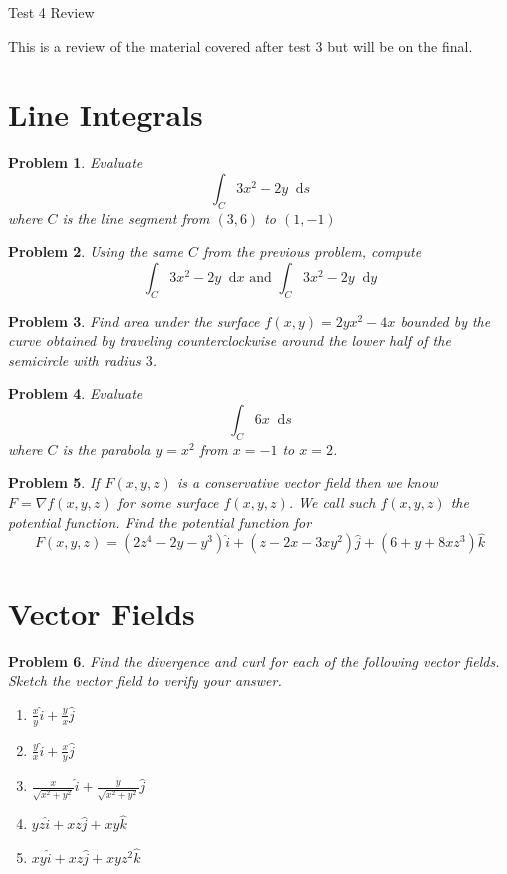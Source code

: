 \documentclass[11pt]{article}
\newtheorem{problem}{Problem}
\newcommand{\vs}{\vspace*{.1in}}
\newcommand*\dif{\mathop{}\!\mathrm{d}}
\begin{document}
\begin{huge}
    \begin{center}
        Test 4 Review
    \end{center}
\end{huge}


\vs\vs

This is a review of the material covered after test 3 but will be on the final.

\section{Line Integrals}

\begin{problem}
Evaluate \[\int_C 3x^2-2y \dif{s}\]  where $C$ is the line segment from $(3,6)$ to $(1,-1)$
\end{problem}

\begin{problem}
    Using the same $C$ from the previous problem, compute \[\int_C 3x^2 - 2y \dif{x} \text{ and } \int_C 3x^2-2y \dif{y}\]
\end{problem}

\begin{problem}
    Find area under the surface $f(x,y)=2yx^2-4x$ bounded by the curve obtained by traveling counterclockwise around the lower half of the semicircle with radius $3$.
\end{problem}

\begin{problem}
    Evaluate \[\int_C 6x \dif{s}\] where $C$ is the parabola $y=x^2$ from $x=-1$ to $x=2$.
\end{problem}

\begin{problem}
If $F(x,y,z)$ is a conservative vector field then we know $F = \nabla f(x,y,z)$ for some surface $f(x,y,z)$. We call such $f(x,y,z)$ the potential function. Find the potential function for \[F(x,y,z) = (2z^4-2y-y^3)\hat{i}+(z-2x-3xy^2)\hat{j}+(6+y+8xz^3)\hat{k}\]
\end{problem}



\section{Vector Fields}

\begin{problem}
Find the divergence and curl for each of the following vector fields. Sketch the vector field to verify your answer.

\begin{enumerate}
    \item $\frac{x}{y}\hat{i}+\frac{y}{x}\hat{j}$
    \item $\frac{y}{x}\hat{i}+\frac{x}{y}\hat{j}$
    \item $\frac{x}{\sqrt{x^2+y^2}}\hat{i}+\frac{y}{\sqrt{x^2+y^2}}\hat{j}$
    \item $yz\hat{i} + xz\hat{j}+xy\hat{k}$
    \item $xy\hat{i}+xz\hat{j}+xyz^2\hat{k}$
\end{enumerate}
\end{problem}
\end{document}
